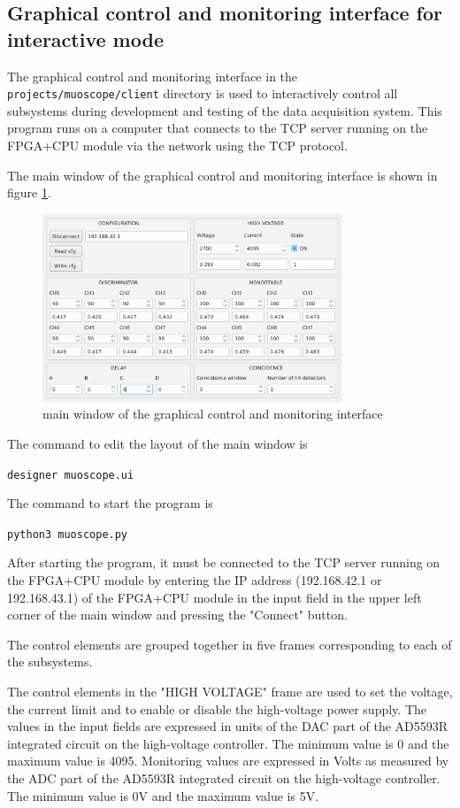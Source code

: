 \documentclass[12pt, a4paper]{article}
\begin{document}
\subsection{Graphical control and monitoring interface for interactive mode}

The graphical control and monitoring interface in the \texttt{projects/muoscope/client} directory is used to interactively control all subsystems during development and testing of the data acquisition system. This program runs on a computer that connects to the TCP server running on the FPGA+CPU module via the network using the TCP protocol.

The main window of the graphical control and monitoring interface is shown in figure \ref{fig:gui}.

\begin{figure}[h!]
  \centering
  \includegraphics[width=0.8\textwidth]{images/gui.png}
  \caption{main window of the graphical control and monitoring interface}
  \label{fig:gui}
\end{figure}

The command to edit the layout of the main window is

\texttt{designer muoscope.ui}

The command to start the program is

\texttt{python3 muoscope.py}

After starting the program, it must be connected to the TCP server running on the FPGA+CPU module by entering the IP address (192.168.42.1 or 192.168.43.1) of the FPGA+CPU module in the input field in the upper left corner of the main window and pressing the "Connect" button.

The control elements are grouped together in five frames corresponding to each of the subsystems.

The control elements in the "HIGH VOLTAGE" frame are used to set the voltage, the current limit and to enable or disable the high-voltage power supply. The values in the input fields are expressed in units of the DAC part of the AD5593R integrated circuit on the high-voltage controller. The minimum value is 0 and the maximum value is 4095. Monitoring values are expressed in Volts as measured by the ADC part of the AD5593R integrated circuit on the high-voltage controller. The minimum value is 0V and the maximum value is 5V.
\end{document}
